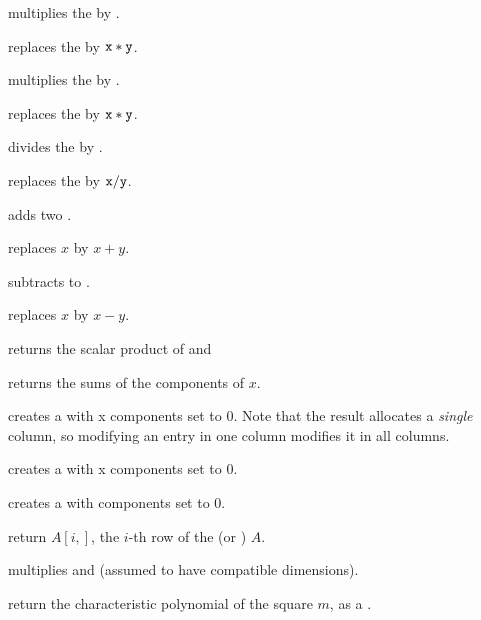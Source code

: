 multiplies the 
 by .

 replaces
the   by ${\tt x}*{\tt y}$.

 multiplies the 
 by .

 replaces
the   by ${\tt x}*{\tt y}$.

 divides the 
 by .

 replaces
the   by ${\tt x}/{\tt y}$.

 adds two .

 replaces
$x$ by $x+y$.

 subtracts  to .

 replaces
$x$ by $x-y$.

 returns the scalar product
of  and 

 returns the sums of the components of $x$.

 creates a  with  x 
components set to $0$. Note that the result allocates a
\emph{single} column, so modifying an entry in one column modifies it in
all columns.

 creates a  with  x
 components set to $0$.

 creates a  with  components set to
$0$.

 return $A[i,]$, the $i$-th row of the
 (or ) $A$.

 multiplies   and 
(assumed to have compatible dimensions).

 return the characteristic polynomial of
the square  $m$, as a .


